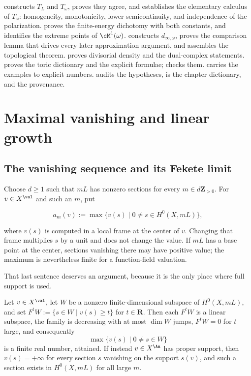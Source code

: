  constructs $T_L$ and $T_\omega$, proves they
agree, and establishes the elementary calculus of $T_\omega$:
homogeneity, monotonicity, lower semicontinuity, and independence of the
polarization.   proves the finite-energy dichotomy
 with both constants, and identifies the
extreme points of $\cM^1(\omega)$.  
constructs $d_{\infty,\omega}$, proves the comparison lemma that drives
every later approximation argument, and assembles the topological theorem.
 proves divisorial density and the dual-complex
statements.   proves the toric dictionary and
 the explicit formulae; 
checks them.   carries the examples to explicit numbers.   audits the hypotheses,
 is the chapter dictionary, and
 the provenance.

\section{Maximal vanishing and linear growth}
\label{sec:ch49-growth}

\subsection{The vanishing sequence and its Fekete limit}
\label{sec:ch49-vanishing}

Choose $d\geq1$ such that $mL$ has nonzero sections for every
$m\in d\mathbf Z_{>0}$.  For $v\in X^{\val}$ and such an $m$, put

\[
 a_m(v):=\max\{v(s)\mid 0\ne s\in H^0(X,mL)\},
\tag{49.1}\label{eq:bj-max-vanishing}
\]

where $v(s)$ is computed in a local frame at the center of $v$.
Changing that frame multiplies $s$ by a unit and does not change the
value.  If $mL$ has a base point at the center, sections vanishing there
may have positive value; the maximum is nevertheless finite for a
function-field valuation.

That last sentence deserves an argument, because it is the only place where
full support is used.

\begin{lemma}
\label{lem:ch49-am-finite}
Let $v\in X^{\val}$, let $W$ be a nonzero finite-dimensional subspace of
$H^0(X,mL)$, and set $F^tW:=\{s\in W\mid v(s)\ge t\}$ for
$t\in\mathbf R$.  Then each $F^tW$ is a linear subspace, the family is
decreasing with at most $\dim W$ jumps, $F^tW=0$ for $t$ large, and
consequently
\[
 \max\{v(s)\mid 0\ne s\in W\}
\]
is a finite real number, attained.  If instead $v\in X^{\An}$ has proper
support, then $v(s)=+\infty$ for every section $s$ vanishing on the
support $s(v)$, and such a section exists in $H^0(X,mL)$ for all large
$m$.
\end{lemma}


